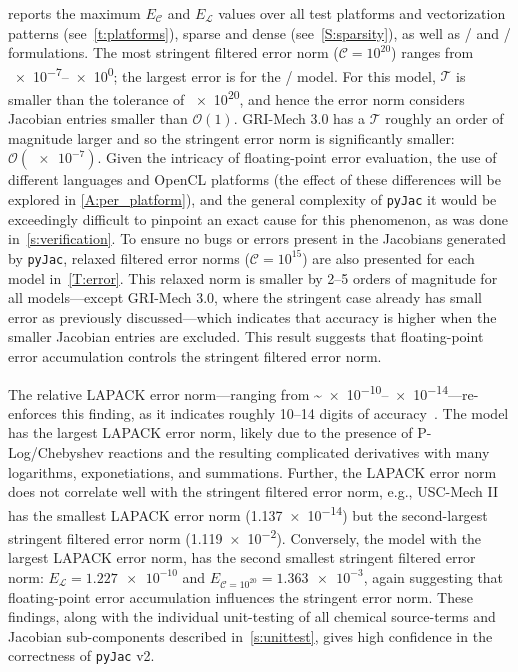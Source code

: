 \documentclass[12pt,number,sort&compress,preprint]{elsarticle}
\begin{document}
 reports the maximum $E_{\mathcal{C}}$ and $E_{\mathcal{L}}$ values over all test platforms and vectorization patterns (see~\cref{t:platforms}), sparse and dense (see~\cref{S:sparsity}), as well as \conp/ and \conv/ formulations.
The most stringent filtered error norm ($\mathcal{C} = 10^{20}$) ranges from \numrange[retain-zero-exponent=true]{e-7}{e0}; the largest error is for the \slash{} model.
For this model, $\mathcal{T}$ is smaller than the tolerance of \num{e20}, and hence the error norm considers Jacobian entries smaller than $\mathcal{O}(1)$.
GRI-Mech 3.0 has a $\mathcal{T}$ roughly an order of magnitude larger and so the stringent error norm is significantly smaller: $\mathcal{O}(\num{e-7})$.
Given the intricacy of floating-point error evaluation, the use of different languages and OpenCL platforms (the effect of these differences will be explored in \cref{A:per_platform}), and the general complexity of \texttt{pyJac} it would be exceedingly difficult to pinpoint an exact cause for this phenomenon, as was done in~\cref{s:verification}.
To ensure no bugs or errors present in the Jacobians generated by \texttt{pyJac}, relaxed filtered error norms ($\mathcal{C} = 10^{15}$) are also presented for each model in~\cref{T:error}.
This relaxed norm is smaller by \numrange{2}{5} orders of magnitude for all models---except GRI-Mech 3.0, where the stringent case already has small error as previously discussed---which indicates that accuracy is higher when the smaller Jacobian entries are excluded.
This result suggests that floating-point error accumulation controls the stringent filtered error norm.

The relative LAPACK error norm---ranging from \textasciitilde\numrange{e-10}{e-14}---re-enforces this finding, as it indicates roughly \numrange{10}{14} digits of accuracy~\cite{Anderson:1999aa}.
The  model has the largest LAPACK error norm, likely due to the presence of P-Log\slash Chebyshev reactions and the resulting complicated derivatives with many logarithms, exponetiations, and summations.
Further, the LAPACK error norm does not correlate well with the stringent filtered error norm, e.g., USC-Mech II has the smallest LAPACK error norm (\num{1.137e-14}) but the second-largest stringent filtered error norm (\num{1.119e-2}).
Conversely, the model with the largest LAPACK error norm,  has the second smallest stringent filtered error norm: $E_{\mathcal{L}} = \num{1.227e-10}$ and $E_{\mathcal{C} = 10^{20}} = \num{1.363e-3}$, again suggesting that floating-point error accumulation influences the stringent error norm.
These findings, along with the individual unit-testing of all chemical source-terms and Jacobian sub-components described in~\cref{s:unittest}, gives high confidence in the correctness of \texttt{pyJac} v2.
\end{document}
